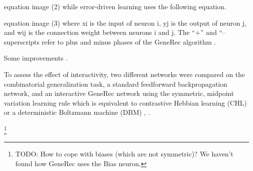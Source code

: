 equation image	(2)
while error-driven learning uses the following equation.

equation image	(3)
where xi is the input of neuron i, yj is the output of neuron j, and wij is the connection weight between neurons i and j. The “+” and “– superscripts refer to plus and minus phases of the GeneRec algorithm \citet{nawrocki2012monitoring}.

Some improvements \citet{da2008biological}. 

To assess the effect of interactivity, two different networks were compared on the combinatorial generalization task, a standard feedforward backpropagation network, and an interactive GeneRec network using the symmetric, midpoint variation learning rule which is equivalent to contrastive Hebbian learning (CHL) or a deterministic Boltzmann machine (DBM) \citet{o1996bio}, \citet{o2001generalization}. 
 
\footnote{TODO: How to cope with biases (which are not symmetric)? We haven't found how GeneRec uses the Bias neuron.} 

